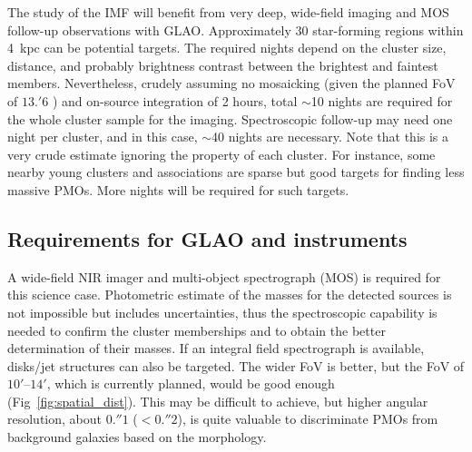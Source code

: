 The study of the IMF will benefit from very deep, wide-field imaging and
MOS follow-up observations with GLAO. Approximately 30 star-forming
regions within 4~kpc can be potential targets. The required nights
depend on the cluster size, distance, and probably brightness contrast
between the brightest and faintest members. Nevertheless, crudely
assuming no mosaicking (given the planned FoV of $13.'6$ ) and on-source
integration of 2 hours, total $\sim$10 nights are required for the whole
cluster sample for the imaging. Spectroscopic follow-up may need one
night per cluster, and in this case, $\sim$40 nights are necessary. Note
that this is a very crude estimate ignoring the property of each
cluster. For instance, some nearby young clusters and associations are
sparse but good targets for finding less massive PMOs. More nights will
be required for such targets.  

\subsection{Requirements for GLAO and instruments}
A wide-field NIR imager and multi-object spectrograph (MOS) is required
for this science case. Photometric estimate of the masses for the
detected sources is not impossible but  includes uncertainties, thus the
spectroscopic capability is needed to confirm the cluster memberships
and to obtain the better determination of their masses. If an integral
field spectrograph is available, disks/jet structures can also be
targeted. The wider FoV is better, but the FoV of $10'$--$14'$, which is
currently planned, would be good enough
(Fig~\ref{fig:spatial_dist}). This may be difficult to achieve, but
higher angular resolution, about $0.''1$ ($< 0.''2$), is quite valuable
to discriminate PMOs from background galaxies based on the morphology.  

